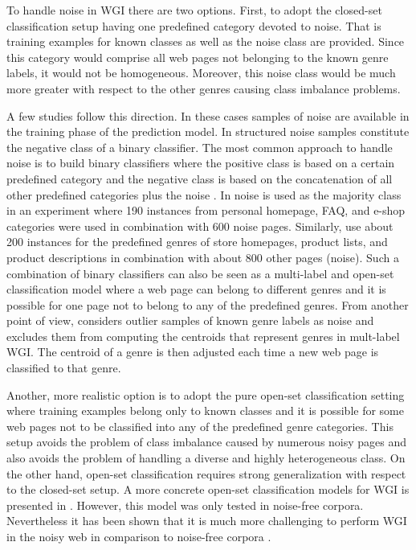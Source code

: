 To handle noise in WGI there are two options. First, to adopt the closed-set classification setup having one predefined category devoted to noise. That is training examples for known classes as well as the noise class are provided. Since this category would comprise all web pages not belonging to the known genre labels, it would not be homogeneous. Moreover, this noise class would be much more greater with respect to the other genres causing class imbalance problems. 

A few studies follow this direction. In these cases samples of noise are available in the training phase of the prediction model. In \parencite{Vidulin2007} structured noise samples constitute the negative class of a binary classifier. The most common approach to handle noise is to build binary classifiers where the positive class is based on a certain predefined category and the negative class is based on the concatenation of
all other predefined categories plus the noise . In 
noise is used as the majority class in an experiment where 190 instances from personal homepage, FAQ, and e-shop categories were used in combination with 600 noise pages. Similarly,  use about 200 instances for the predefined genres of store homepages, product lists, and product descriptions in combination with about 800 other pages (noise). Such a combination of binary classifiers can also be seen as a multi-label and open-set classification model where a web page can belong to different genres and it is possible for one page not to belong to any of the predefined genres. From another point of view,  considers outlier samples of known genre labels as noise and excludes them from computing the centroids that represent genres in mult-label WGI. The centroid of a genre is then adjusted each time a new web page is classified to that genre. 

Another, more realistic option is to adopt the pure open-set classification setting where training examples belong only to known classes and it is possible for some web pages not to be classified into any of the predefined genre categories. This setup avoids the problem of class imbalance caused by numerous noisy pages and also avoids the problem of handling a diverse and highly heterogeneous class. On the other hand, open-set classification requires strong generalization with respect to the closed-set setup. A more concrete open-set classification models for WGI is presented in \parencite{stubbe2007genre}. However, this model was only tested in noise-free corpora. Nevertheless it has been shown that it is much more challenging to perform WGI in the noisy web in comparison to noise-free corpora \parencite{Asheghi2015}.

